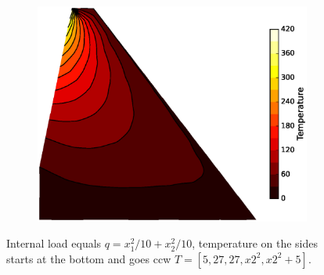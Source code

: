 \documentclass[10pt, a4paper]{article}
\begin{document}
\begin{figure}[H]
	\begin{subfigure}[H]{0.33\textwidth}
		\includegraphics[width=\textwidth]{fig/exdam3_3.eps}
		\caption{}
		\label{fig:3}
	\end{subfigure}
	\caption{Internal load equals $q=x_1^2/10 + x_2^2/10$, temperature on the sides starts at the bottom and goes ccw $T=[5, 27, 27, x2^2, x2^2+5]$.}
	\label{fig:3_1}
\end{figure}
\end{document}

